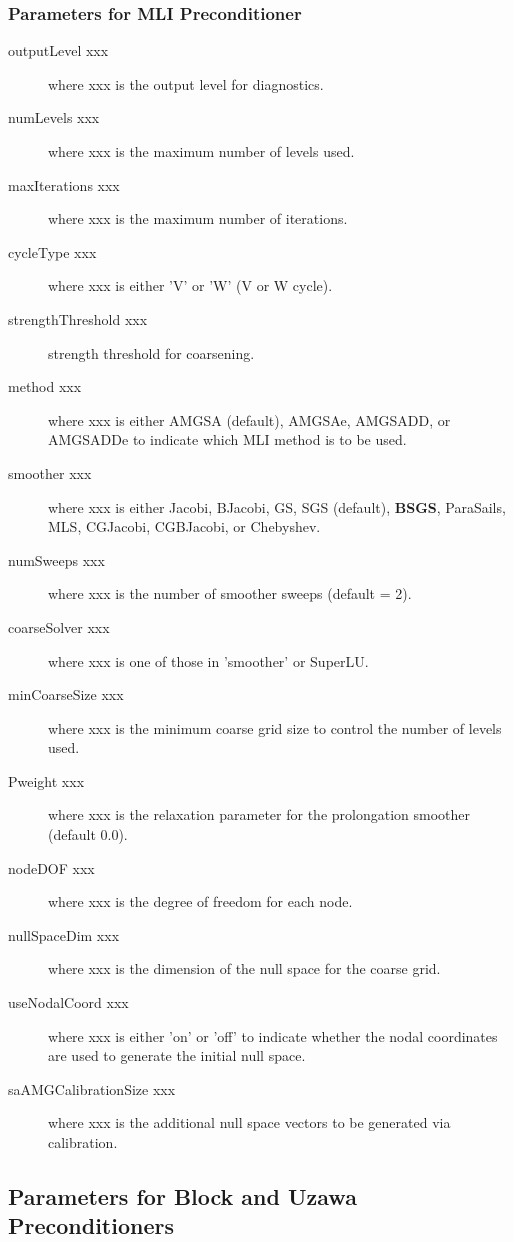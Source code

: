 \subsubsection{Parameters for MLI Preconditioner}
\begin{description}
\item[outputLevel xxx] where xxx is the output level for diagnostics.
\item[numLevels xxx] where xxx is the maximum number of levels used.
\item[maxIterations xxx] where xxx is the maximum number of iterations.
\item[cycleType xxx] where xxx is either 'V' or 'W' (V or W cycle).
\item[strengthThreshold xxx] strength threshold for coarsening.
\item[method xxx] where xxx is either {\sf AMGSA} (default), {\sf AMGSAe},
     {\sf AMGSADD}, or {\sf AMGSADDe} to indicate which MLI method is to be
     used.
\item[smoother xxx] where xxx is either {\sf Jacobi}, {\sf BJacobi}, {\sf GS}, 
     {\sf SGS} (default), {\bf BSGS}, {\sf ParaSails}, {\sf MLS}, 
     {\sf CGJacobi}, {\sf CGBJacobi}, or {\sf Chebyshev}.
\item[numSweeps xxx] where xxx is the number of smoother sweeps (default = 2).
\item[coarseSolver xxx] where xxx is one of those in 'smoother' or
     {\sf SuperLU}.
\item[minCoarseSize xxx] where xxx is the minimum coarse grid size to
     control the number of levels used.
\item[Pweight xxx] where xxx is the relaxation parameter for the prolongation
     smoother (default 0.0).
\item[nodeDOF xxx] where xxx is the degree of freedom for each node.
\item[nullSpaceDim xxx] where xxx is the dimension of the null space for
     the coarse grid.
\item[useNodalCoord xxx] where xxx is either 'on' or 'off' to indicate whether
     the nodal coordinates are used to generate the initial null space.
\item[saAMGCalibrationSize xxx] where xxx is the additional null space 
     vectors to be generated via calibration.
\end{description}

\subsection{Parameters for Block and Uzawa Preconditioners}

